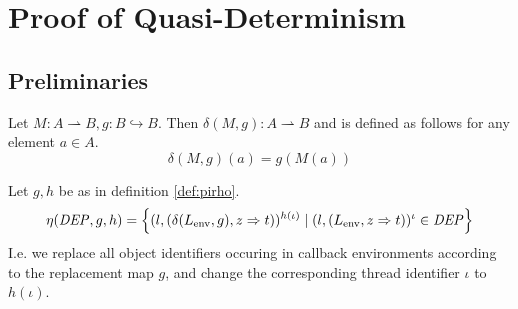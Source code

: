 \chapter{Proof of Quasi-Determinism}
\label{cha:proof_of_qd}

\section{Preliminaries}
\label{sec:preliminaries}

\begin{definition}
  Let $M: A \rightharpoonup B, g: B \hookrightarrow B$. Then $\delta(M, g): A
  \rightharpoonup B$ and is defined as follows for any element $a \in A$.
  \begin{equation*}
    \delta(M, g)(a) = g(M(a))
  \end{equation*}
\end{definition}

\begin{definition}
  Let $g, h$ be as in definition \ref{def:pirho}. 
  \begin{equation*}
    \eta(\mathit{DEP}, g, h) = \left\{ (l, (\delta(L_{\text{env}}, g), z \Rightarrow
    t))^{h(\iota)} \mid (l,
    (L_{\text{env}}, z \Rightarrow t))^\iota \in \mathit{DEP} \right\}
  \end{equation*}
  I.e. we replace all object identifiers occuring in callback environments
  according to the replacement map $g$, and change the corresponding thread
  identifier $\iota$ to $h(\iota)$.
\end{definition}

